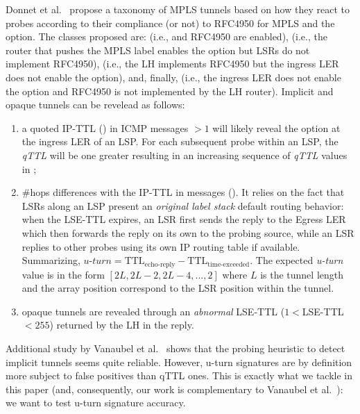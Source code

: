 Donnet et al.~\cite{Donnet12} propose a taxonomy of MPLS tunnels
based on how they react to \traceroute probes according to their compliance (or
not) to RFC4950 for MPLS and the \tpropagate option.  The classes proposed are:
 (i.e., \tpropagate and RFC4950 are enabled),
 (i.e., the router that pushes the MPLS label enables the
\tpropagate option but LSRs do not implement RFC4950), 
(i.e., the LH implements RFC4950 but the ingress LER does not enable the
\tpropagate option), and, finally,  (i.e., the ingress
LER does not enable the \tpropagate option and RFC4950 is not implemented by the
LH router).  Implicit and opaque tunnels can be revelead as follows:
\begin{enumerate}
  \item a quoted IP-TTL () in ICMP \ttlexceeded
  messages $>1$ will likely reveal the \tpropagate option at the ingress LER of
  an LSP. For each subsequent \traceroute probe within an LSP, the \textit{qTTL} will be
  one greater resulting in an increasing sequence of \textit{qTTL} values in \traceroute;
  \item  \#hops differences with the IP-TTL in \echoreply messages
  ().  It relies on the fact that LSRs along an LSP present an
  \textit{original label stack} default routing behavior: when the LSE-TTL
  expires, an LSR first sends the \ttlexceeded reply to the Egress LER which
  then forwards the reply on its own to the probing source, while an LSR
  replies to other probes using its own IP routing table if available. Summarizing, 
   $\textit{u-turn}=\text{TTL}_{\text{echo-reply}}-\text{TTL}_{\text{time-exceeded}}$.  The
  expected \textit{u-turn} value is in the form $[2L, 2L-2, 2L-4,..., 2]$ where $L$
  is the tunnel length and the array position correspond to the LSR position
  within the tunnel.
  \item opaque tunnels are revealed through an \textit{abnormal} LSE-TTL
  ($1<$LSE-TTL$<255$) returned by the LH in the \ttlexceeded reply.
\end{enumerate}

Additional study by Vanaubel et al.~\cite{VAN2013} shows that the probing
heuristic to detect implicit tunnels seems quite reliable.  However, u-turn
signatures are by definition more subject to false positives than qTTL ones. 
This is exactly what we tackle in this paper (and, consequently, our work is
complementary to Vanaubel et al.~\cite{VAN2013}): we want to test u-turn
signature accuracy.




